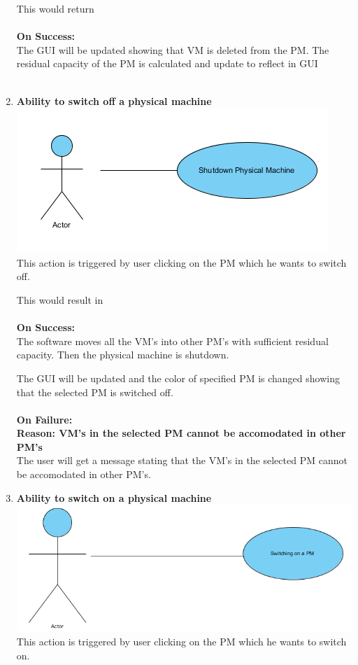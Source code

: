 \documentclass[a4paper,11pt]{article}
\begin{document}
\begin{enumerate}
				This would return \\\\
				{\bf On Success: }\\
				The GUI will be updated showing that VM  is deleted from the PM.
				The residual capacity of the PM is calculated and update to reflect in GUI\\\\
				
				\item {\bf Ability to switch off a physical machine}\\
				\includegraphics{images/shut}
				\\This action is triggered by user clicking on the PM which he wants to switch off. 
								
				This would result in \\\\
				{\bf On Success: }\\
				The software moves all the VM's into other PM's with sufficient residual capacity. Then the physical machine is shutdown.
			
				The GUI will be updated and the color of specified PM is changed showing that the selected PM is switched off.
				\\\\
				{\bf On Failure: } \\
				{\bf Reason: VM's in the selected PM cannot be accomodated in other PM's}\\
				The user will get a message stating that the VM's in the selected PM cannot be accomodated in other PM's.
				
				\item {\bf Ability to switch on a physical machine}\\
				\includegraphics[scale=0.7]{images/onpm}
				\\This action is triggered by user clicking on the PM which he wants to switch on. 
				

\end{enumerate}
\end{document}
